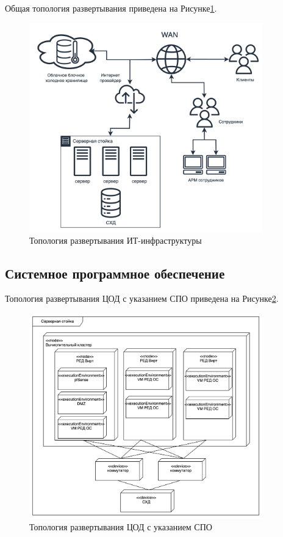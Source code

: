 \documentclass[14pt, a4paper]{extarticle}
\begin{document}
Общая топология развертывания приведена на Рисунке\;\ref{fig:infra2}.

\begin{figure}[H]
  \centering
  \includegraphics[width=0.9\textwidth]{infra2_2.png}
  \caption{Топология развертывания ИТ-инфраструктуры}
  \label{fig:infra2}
\end{figure}

\subsection{Системное программное обеспечение}


Топология развертывания ЦОД с указанием СПО приведена на Рисунке\;\ref{fig:deployment_server}.

\begin{figure}[H]
  \centering
  \includegraphics[width=0.9\textwidth]{deployment_server.png}
  \caption{Топология развертывания ЦОД с указанием СПО}
  \label{fig:deployment_server}
\end{figure}
\end{document}
